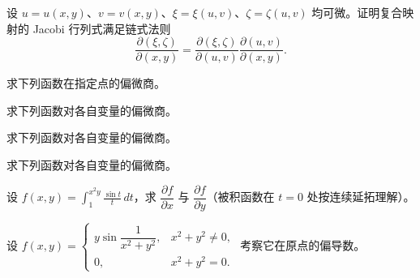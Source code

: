 \noindent\begin{minipage}{\textwidth}
设 $u=u(x,y)$、$v=v(x,y)$、$\xi=\xi(u,v)$、$\zeta=\zeta(u,v)$ 均可微。证明复合映射的 Jacobi 行列式满足链式法则\[\frac{\partial(\xi,\zeta)}{\partial(x,y)}=\frac{\partial(\xi,\zeta)}{\partial(u,v)}\frac{\partial(u,v)}{\partial(x,y)}.\]
\end{minipage}\par\vfill
\noindent\begin{minipage}{\textwidth}
求下列函数在指定点的偏微商。
\end{minipage}\par\vfill
\newpage
\noindent\begin{minipage}{\textwidth}
求下列函数对各自变量的偏微商。
\end{minipage}\par\vfill
\noindent\begin{minipage}{\textwidth}
求下列函数对各自变量的偏微商。
\end{minipage}\par\vfill
\noindent\begin{minipage}{\textwidth}
求下列函数对各自变量的偏微商。
\end{minipage}\par\vfill
\noindent\begin{minipage}{\textwidth}
设 $f(x,y)=\displaystyle\int_1^{x^2y}\frac{\sin t}{t}\,dt$，求 $\dfrac{\partial f}{\partial x}$ 与 $\dfrac{\partial f}{\partial y}$（被积函数在 $t=0$ 处按连续延拓理解）。
\end{minipage}\par\vfill
\newpage
\noindent\begin{minipage}{\textwidth}
设 $f(x,y)=\begin{cases}y\sin\dfrac1{x^2+y^2},&x^2+y^2\ne0,\\0,&x^2+y^2=0.\end{cases}$ 考察它在原点的偏导数。
\end{minipage}\par\vfill
